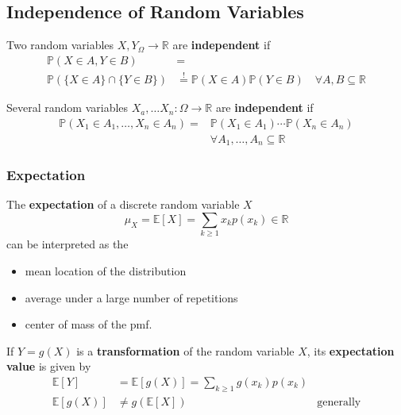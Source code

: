 \subsection{Independence of Random Variables}
Two random variables $X,Y_\Omega \rightarrow\mathbb{R}$ are \textbf{independent} if
\noindent\begin{align*}
    \mathbb{P}(X\in A,Y\in B)            & =                                                                                     \\
    \mathbb{P}(\{X\in A\}\cap\{Y\in B\}) & \overset{!}{=}\mathbb{P}(X\in A)\mathbb{P}(Y\in B)\quad\forall A,B\subseteq\mathbb{R}
\end{align*}

Several random variables $X_a, \dots X_n :\Omega\rightarrow\mathbb{R}$ are \textbf{independent} if
\noindent\begin{align*}
    \mathbb{P}(X_1\in A_1,\ldots,X_n\in A_n) = & \mathbb{P}(X_1\in A_1)\cdots\mathbb{P}(X_n\in A_n) \\
                                               & \forall A_1,\ldots,A_n\subseteq\mathbb{R}
\end{align*}

\subsubsection{Expectation}
The \textbf{expectation} of a discrete random variable $X$
\noindent\begin{equation*}
    \mu_{X}=\mathbb{E}[X]=\sum_{k\geq1}x_{k}p(x_{k})\in\mathbb{R}
\end{equation*}
can be interpreted as the
\begin{itemize}
    \item mean location of the distribution
    \item average under a large number of repetitions
    \item center of mass of the pmf.
\end{itemize}

\newpar{}
If $Y=g(X)$ is a \textbf{transformation} of the random variable $X$, its \textbf{expectation value} is given by
\noindent\begin{align*}
    \mathbb{E}[Y]    & =\mathbb{E}[g(X)]=\sum_{k\geq1}g(x_{k})p(x_{k})                    \\
    \mathbb{E}[g(X)] & \neq g(\mathbb{E}[X])                           & \text{generally}
\end{align*}

